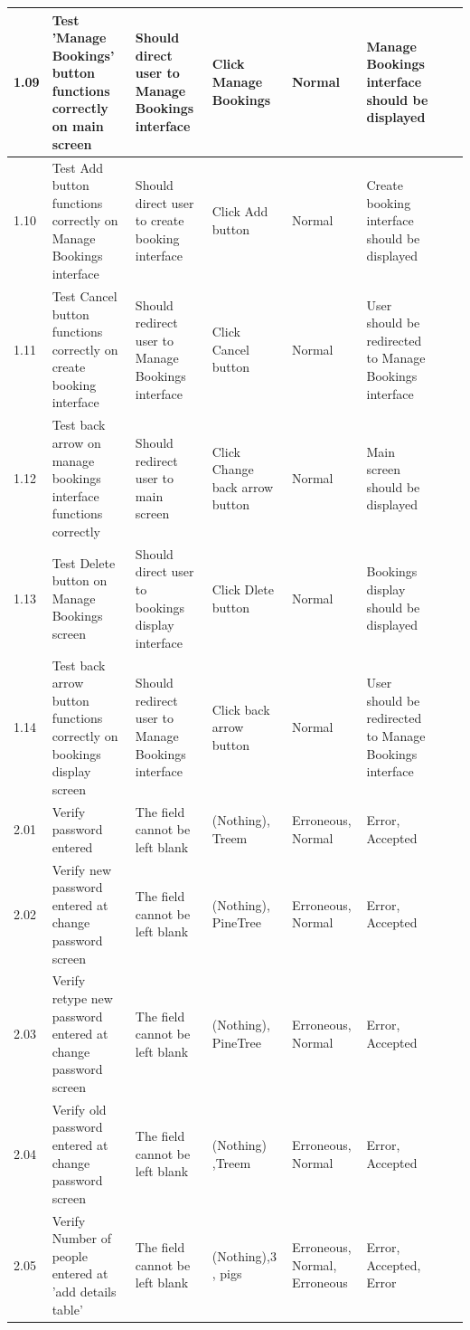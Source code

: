 \begin{landscape}
\begin{center}
\begin{longtable}{|p{1.5cm}|p{2.5cm}|p{2.5cm}|p{2cm}|p{2cm}|p{2cm}|p{2cm}|p{2cm}|}
        1.09 & Test 'Manage Bookings' button functions correctly on main screen & Should direct user to Manage Bookings interface  & Click Manage Bookings & Normal & Manage Bookings interface should be displayed &  &  \\ \hline
        1.10 & Test Add button functions correctly on Manage Bookings interface & Should direct user to create booking interface  & Click Add button & Normal & Create booking interface should be displayed &  &  \\ \hline
        1.11 & Test Cancel button functions correctly on create booking interface & Should redirect user to Manage Bookings interface  & Click Cancel button & Normal & User should be redirected to Manage Bookings interface &  &  \\ \hline
        1.12 & Test back arrow on manage bookings interface functions correctly & Should redirect user to main screen  & Click Change back arrow button & Normal & Main screen should be displayed &  &  \\ \hline
        1.13 & Test Delete button on Manage Bookings screen & Should direct user to bookings display interface  & Click Dlete button & Normal & Bookings display should be displayed  &  &  \\ \hline
        1.14 & Test back arrow button functions correctly on bookings display screen & Should redirect user to Manage Bookings interface  & Click back arrow button & Normal & User should be redirected to Manage Bookings interface &  &  \\ \hline
        2.01 & Verify password entered & The field cannot be left blank  & (Nothing), Treem & Erroneous, Normal & Error, Accepted &  &  \\ \hline
        2.02 & Verify new password entered at change password screen & The field cannot be left blank  & (Nothing), PineTree & Erroneous, Normal & Error, Accepted &  &  \\ \hline
        2.03 & Verify retype new password entered at change password screen & The field cannot be left blank  & (Nothing), PineTree & Erroneous, Normal & Error, Accepted &  &  \\ \hline
        2.04 & Verify old password entered at change password screen & The field cannot be left blank  & (Nothing) ,Treem & Erroneous, Normal & Error, Accepted &  &  \\ \hline
        2.05 & Verify Number of people entered at 'add details table' & The field cannot be left blank  & (Nothing),3 , pigs& Erroneous, Normal, Erroneous & Error, Accepted, Error &  &  \\ \hline

\end{longtable}
\end{center}
\end{landscape}
